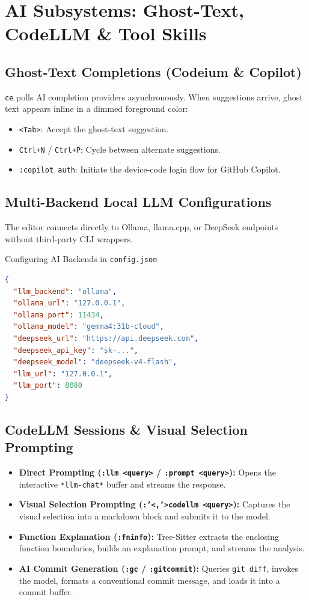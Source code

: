 \documentclass[11pt,a4paper,openany]{book}
\newcommand{\code}[1]{\colorbox{inlinebg}{\texttt{#1}}}
\begin{document}
\chapter{AI Subsystems: Ghost-Text, CodeLLM \& Tool Skills}

\section{Ghost-Text Completions (Codeium \& Copilot)}
\texttt{ce} polls AI completion providers asynchronously. When suggestions arrive, ghost text appears inline in a dimmed foreground color:
\begin{itemize}[noitemsep]
    \item \code{<Tab>}: Accept the ghost-text suggestion.
    \item \code{Ctrl+N} / \code{Ctrl+P}: Cycle between alternate suggestions.
    \item \code{:copilot auth}: Initiate the device-code login flow for GitHub Copilot.
\end{itemize}

\section{Multi-Backend Local LLM Configurations}
The editor connects directly to Ollama, llama.cpp, or DeepSeek endpoints without third-party CLI wrappers.

\begin{recipebox}{Configuring AI Backends in \texttt{config.json}}
\begin{lstlisting}[language=json]
{
  "llm_backend": "ollama",
  "ollama_url": "127.0.0.1",
  "ollama_port": 11434,
  "ollama_model": "gemma4:31b-cloud",
  "deepseek_url": "https://api.deepseek.com",
  "deepseek_api_key": "sk-...",
  "deepseek_model": "deepseek-v4-flash",
  "llm_url": "127.0.0.1",
  "llm_port": 8080
}
\end{lstlisting}
\end{recipebox}

\section{CodeLLM Sessions \& Visual Selection Prompting}
\begin{itemize}
    \item \textbf{Direct Prompting (\code{:llm <query>} / \code{:prompt <query>}):} Opens the interactive \code{*llm-chat*} buffer and streams the response.
    \item \textbf{Visual Selection Prompting (\code{:'<,'>codellm <query>}):} Captures the visual selection into a markdown block and submits it to the model.
    \item \textbf{Function Explanation (\code{:fninfo}):} Tree-Sitter extracts the enclosing function boundaries, builds an explanation prompt, and streams the analysis.
    \item \textbf{AI Commit Generation (\code{:gc} / \code{:gitcommit}):} Queries \texttt{git diff}, invokes the model, formats a conventional commit message, and loads it into a commit buffer.
\end{itemize}
\end{document}
